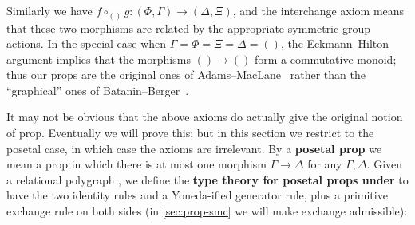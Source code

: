 \documentclass{book}
\let\types\vdash
\begin{document}
Similarly we have $f\circ_{()}g : (\Phi,\Gamma) \to (\Delta,\Xi)$, and the interchange axiom means that these two morphisms are related by the appropriate symmetric group actions.
In the special case when $\Gamma=\Phi=\Xi=\Delta=()$, the Eckmann--Hilton argument implies that the morphisms $()\to ()$ form a commutative monoid; thus our props are the original ones of Adams--MacLane~\cite{maclane:natural-assoc,maclane:cat-alg} rather than the ``graphical'' ones of Batanin--Berger~\cite{bb:htapm}.

It may not be obvious that the above axioms do actually give the original notion of prop.
Eventually we will prove this; but in this section we restrict to the posetal case, in which case the axioms are irrelevant.
By a \textbf{posetal prop} we mean a prop in which there is at most one morphism $\Gamma\to\Delta$ for any $\Gamma,\Delta$.
Given a relational polygraph \cG, we define the \textbf{type theory for posetal props under \cG} to have the two identity rules and a Yoneda-ified generator rule, plus a primitive exchange rule on both sides (in \cref{sec:prop-smc} we will make exchange admissible):
\end{document}
